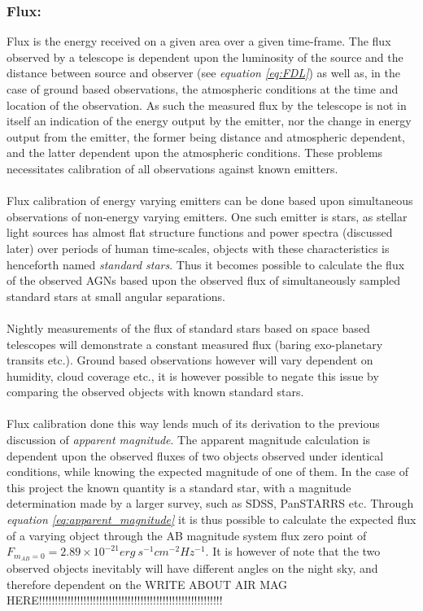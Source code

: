 \documentclass[a4paper, 12pt, twoside]{article}
\begin{document}
\subsubsection{Flux:}
Flux is the energy received on a given area over a given time-frame. The flux observed by a telescope is dependent upon the luminosity of the source and the distance between source and observer (see \emph{equation \ref{eq:FDL}}) as well as, in the case of ground based observations, the atmospheric conditions at the time and location of the observation. As such the measured flux by the telescope is not in itself an indication of the energy output by the emitter, nor the change in energy output from the emitter, the former being distance and atmospheric dependent, and the latter dependent upon the atmospheric conditions. These problems necessitates calibration of all observations against known emitters. \\
\\
Flux calibration of energy varying emitters can be done based upon simultaneous observations of non-energy varying emitters. One such emitter is stars, as stellar light sources has almost flat structure functions and power spectra (discussed later) over periods of human time-scales, objects with these characteristics is henceforth named \emph{standard stars}. Thus it becomes possible to calculate the flux of the observed AGNs based upon the observed flux of simultaneously sampled standard stars at small angular separations. \\
\\
Nightly measurements of the flux of standard stars based on space based telescopes will demonstrate a constant measured flux (baring exo-planetary transits etc.). Ground based observations however will vary dependent on humidity, cloud coverage etc., it is however possible to negate this issue by comparing the observed objects with known standard stars. \\
\\
Flux calibration done this way lends much of its derivation to the previous discussion of \emph{apparent magnitude}. The apparent magnitude calculation is dependent upon the observed fluxes of two objects observed under identical conditions, while knowing the expected magnitude of one of them. In the case of this project the known quantity is a standard star, with a magnitude determination made by a larger survey, such as SDSS, PanSTARRS etc. Through \emph{equation \ref{eq:apparent_magnitude}} it is thus possible to calculate the expected flux of a varying object through the AB magnitude system flux zero point of $F_{m_{AB}=0}=2.89\times10^{-21}erg\ s^{-1}cm^{-2}Hz^{-1}$. It is however of note that the two observed objects inevitably will have different angles on the night sky, and therefore dependent on the WRITE ABOUT AIR MAG HERE!!!!!!!!!!!!!!!!!!!!!!!!!!!!!!!!!!!!!!!!!!!!!!!!!!!!!!!!!!
\end{document}
